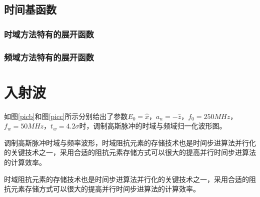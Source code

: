 \documentclass[doctor]{thesisUESTC}
\begin{document}
\subsection{时间基函数}

\subsubsection{时域方法特有的展开函数}

\subsubsection{频域方法特有的展开函数}

\section{入射波}

如图\ref{picb}和图\ref{picc}所示分别给出了参数$E_0=\hat{x}$，$a_n=-\hat{z}$，$f_0=250MHz$，$f_w=50MHz$，$t_w=4.2\sigma$时，调制高斯脉冲的时域与频域归一化波形图。

\begin{graphic}[h]
\caption{调制高斯脉冲时域与频率波形，时域阻抗元素的存储技术也是时间步进算法并行化的关键技术之一，采用合适的阻抗元素存储方式可以很大的提高并行时间步进算法的计算效率。}
\label{fig1}
\end{graphic}
时域阻抗元素的存储技术也是时间步进算法并行化的关键技术之一，采用合适的阻抗元素存储方式可以很大的提高并行时间步进算法的计算效率。
\end{document}
